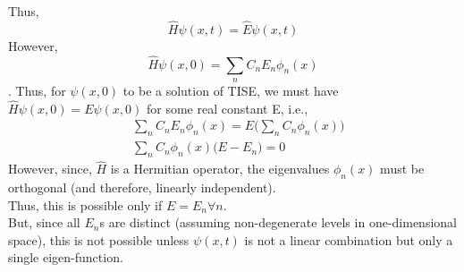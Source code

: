 \documentclass[10pt, a4paper]{article}
\begin{document}
\begin{enumerate}
		Thus, \[ \hat{H}\psi(x,t) = \hat{E}\psi(x,t)\]
		However,
		\[ \hat{H}\psi(x,0) = \sum\limits_{n} C_n E_n\phi_n(x) \].
		Thus, for $\psi(x,0)$ to be a solution of TISE, we must have $\hat{H}\psi(x,0) = E\psi(x,0)$ for some real constant E, i.e.,
		\begin{align*}
			&\sum\limits_{n} C_n E_n\phi_n(x) = E\big(\sum\limits_{n} C_n\phi_n(x)\big) \\
			&\sum\limits_{n} C_n \phi_n(x) \big(E - E_n\big) = 0
		\end{align*}
		However, since, $\hat{H}$ is a Hermitian operator, the eigenvalues $\phi_n(x)$ must be orthogonal (and therefore, linearly independent).\\
		Thus, this is possible only if $E = E_n \forall  n$.\\
		But, since all $E_n$s are distinct (assuming non-degenerate levels in one-dimensional space), this is not possible unless $\psi(x,t)$ is not a linear combination but only a single eigen-function.
	\end{enumerate}
\end{document}
